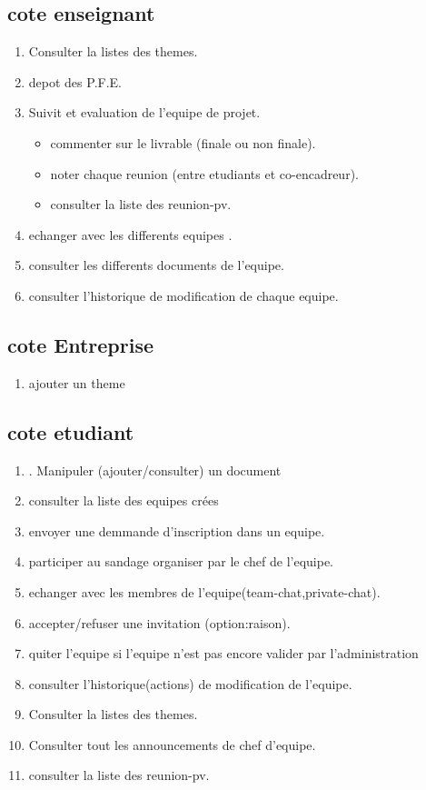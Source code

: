 \documentclass[11pt,fleqn]{book} %
\begin{document}
\subsection{cote enseignant}
\begin{enumerate}
    \item Consulter la listes des themes.
    \item depot des P.F.E.
    \item Suivit et evaluation de l’equipe de projet.
    \begin{itemize}
    
    \item commenter sur le livrable (finale ou non finale).
    \item noter chaque reunion (entre etudiants et co-encadreur).
    \item consulter la liste des reunion-pv.
    \end{itemize}
    \item echanger avec les differents equipes .
    \item consulter les differents documents de l’equipe.
    \item consulter l’historique de modification de chaque equipe.
\end{enumerate}

\subsection{cote Entreprise}
\begin{enumerate}
    \item ajouter un theme
\end{enumerate}

\subsection{cote etudiant} 
\begin{enumerate}
    \item . Manipuler (ajouter/consulter) un document 
    \item consulter la liste des equipes  crées
    \item envoyer une demmande d’inscription dans un equipe.
    \item participer au sandage organiser par le chef de l’equipe.
    \item echanger avec les membres de l’equipe(team-chat,private-chat).
    \item accepter/refuser une invitation (option:raison).
    \item quiter l’equipe si l’equipe n’est pas encore valider par l’administration 
    \item consulter l’historique(actions) de modification de l’equipe.
    \item Consulter la listes des themes.
    \item Consulter tout les announcements de chef d’equipe.
    \item consulter la liste des reunion-pv.

\end{enumerate}
\end{document}
